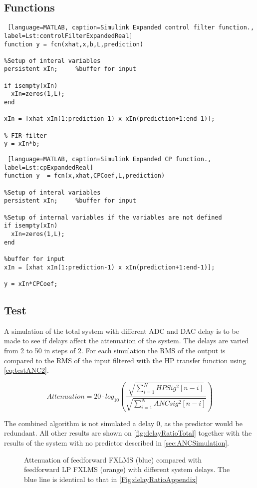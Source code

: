 \subsection{Functions}

\begin{lstlisting} [language=MATLAB, caption=Simulink Expanded control filter function., label=Lst:controlFilterExpandedReal]
function y = fcn(xhat,x,b,L,prediction)

%Setup of interal variables
persistent xIn;     %buffer for input

if isempty(xIn)
  xIn=zeros(1,L);
end

xIn = [xhat xIn(1:prediction-1) x xIn(prediction+1:end-1)];

% FIR-filter
y = xIn*b;
\end{lstlisting}

\begin{lstlisting} [language=MATLAB, caption=Simulink Expanded CP function., label=Lst:cpExpandedReal]
function y  = fcn(x,xhat,CPCoef,L,prediction)

%Setup of interal variables
persistent xIn;     %buffer for input

%Setup of internal variables if the variables are not defined
if isempty(xIn)
  xIn=zeros(1,L);
end

%buffer for input
xIn = [xhat xIn(1:prediction-1) x xIn(prediction+1:end-1)];

y = xIn*CPCoef;
\end{lstlisting}

\subsection{Test}
A simulation of the total system with different ADC and DAC delay is to be made to see if delays affect the attenuation of the system. The delays are varied from 2 to 50 in steps of 2. For each simulation the RMS of the output is compared to the RMS of the input filtered with the HP transfer function using \autoref{eq:testANC2}. 

\begin{equation}\label{eq:testANC2}
	Attenuation=20 \cdot log_{10} \left (\frac{\sqrt{\sum\limits_{i=1}^{N}HPSig^2[n-i]}}{\sqrt{\sum\limits_{i=1}^{N}ANCsig^2[n-i]}}  \right )
\end{equation}

The combined algorithm is not simulated a delay 0, as the predictor would be redundant. All other results are shown on \autoref{fig:delayRatioTotal} together with the results of the system with no predictor described in \autoref{sec:ANCSimulation}.
\begin{figure}[H]
	\centering
	\caption{ Attenuation of feedforward FXLMS (blue) compared with feedforward LP FXLMS (orange) with different system delays. The blue line is identical to that in \autoref{Fig:delayRatioAppendix}}
		\label{fig:delayRatioTotal}
\end{figure}

